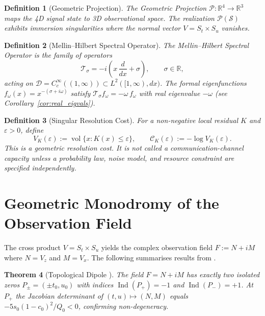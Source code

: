 \documentclass[11pt]{article}
\DeclareMathOperator{\Ind}{Ind}
\newtheorem{theorem}{Theorem}[section]
\newtheorem{definition}[theorem]{Definition}
\begin{document}
\begin{definition}[Geometric Projection]
The \emph{Geometric Projection} $\mathcal{P}: \mathbb{R}^4 \to \mathbb{R}^3$
maps the 4D signal state to 3D observational space.  The realization
$\mathcal{P}(\mathcal{S})$ exhibits immersion singularities where the normal
vector $V = S_t \times S_u$ vanishes.
\end{definition}

\begin{definition}[Mellin--Hilbert Spectral Operator]
\label{def:mellin_hilbert}
The \emph{Mellin--Hilbert Spectral Operator} is the family of operators
\[
  \mathcal{T}_\sigma = -i\!\left(x\,\frac{d}{dx} + \sigma\right),
  \qquad \sigma \in \mathbb{R},
\]
acting on $\mathcal{D} = C_c^\infty((1,\infty)) \subset L^2([1,\infty), dx)$.
The formal eigenfunctions $f_\omega(x) = x^{-(\sigma + i\omega)}$ satisfy
$\mathcal{T}_\sigma f_\omega = -\omega\, f_\omega$ with \emph{real} eigenvalue
$-\omega$ (see Corollary~\ref{cor:real_eigvals}).
\end{definition}

\begin{definition}[Singular Resolution Cost]
For a non-negative local residual $K$ and $\varepsilon>0$, define
\[
  V_K(\varepsilon):=\operatorname{vol}\{x:K(x)\le\varepsilon\},
  \qquad
  \mathcal C_K(\varepsilon):=-\log V_K(\varepsilon).
\]
This is a geometric resolution cost.  It is not called a communication-channel
capacity unless a probability law, noise model, and resource constraint are
specified independently.
\end{definition}

\section{Geometric Monodromy of the Observation Field}
\label{sec:mono}
The cross product $V = S_t \times S_u$ yields the complex observation field
$F := N + iM$ where $N = V_z$ and $M = V_x$.  The following summarises results
from \cite{HayamiRuledSurface2026}.

\begin{theorem}[Topological Dipole \cite{HayamiRuledSurface2026}]
\label{thm:dipole_summary}
The field $F = N + iM$ has exactly two isolated zeros
$P_\pm = (\pm t_0, u_0)$ with indices $\Ind(P_+) = -1$ and $\Ind(P_-) = +1$.
At $P_+$ the Jacobian determinant of $(t,u)\mapsto(N,M)$ equals
$-5s_0(1-c_0)^2/Q_0 < 0$, confirming non-degeneracy.
\end{theorem}
\end{document}
